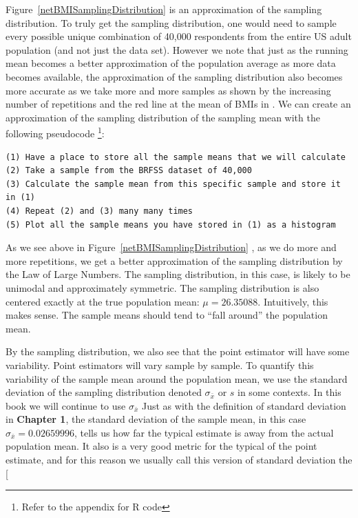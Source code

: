 Figure~\ref{netBMISamplingDistribution} is an approximation of the sampling distribution. To truly get the sampling distribution, one would need to sample every possible unique combination of 40,000 respondents from the entire US adult population (and not just the  data set). However we note that just as the running mean becomes a better approximation of the population average as more data becomes available, the approximation of the sampling distribution also becomes more accurate as we take more and more samples as shown by the increasing number of repetitions and the red line at the mean of BMIs in . We can create an approximation of the sampling distribution of the sampling mean with the following pseudocode \footnote{Refer to the appendix for R code}: 

\begin{verbatim}
(1) Have a place to store all the sample means that we will calculate
(2) Take a sample from the BRFSS dataset of 40,000
(3) Calculate the sample mean from this specific sample and store it in (1)
(4) Repeat (2) and (3) many many times 
(5) Plot all the sample means you have stored in (1) as a histogram
\end{verbatim}
  
As we see above in Figure~\ref{netBMISamplingDistribution} , as we do more and more repetitions, we get a better approximation of the sampling distribution by the Law of Large Numbers. The sampling distribution, in this case, is likely to be unimodal and approximately symmetric. The sampling distribution is also centered exactly at the true population mean: $\mu=26.35088$. Intuitively, this makes sense. The sample means should tend to ``fall around'' the population mean.

By the sampling distribution, we also see that the point estimator will have some variability. Point estimators will vary sample by sample. To quantify this variability of the sample mean around the population mean, we use the standard deviation of the sampling distribution denoted  $\sigma_{\bar{x}}$ or $s$ in some contexts. In this book we will continue to use $\sigma_{\bar{x}}$ Just as with the definition of standard deviation in \textbf{Chapter 1}, the standard deviation of the sample mean, in this case  $\sigma_{\bar{x}}=0.02659996$, tells us how far the typical estimate is away from the actual population mean. It also is a very good metric for the typical  of the point estimate, and for this reason we usually call this version of standard deviation the  \marginpar[\raggedright\vspace{-4mm}

